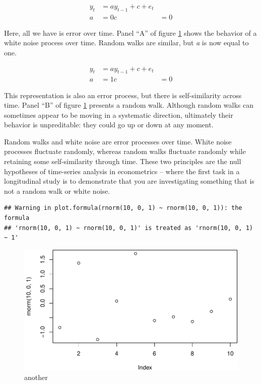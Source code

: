 \documentclass[]{article}
\begin{document}
\begin{equation}
\begin{split}
\label{whitenoise}
y_{t} &= a y_{t-1} + c + e_{t} \\ 
a &= 0
c &= 0
\end{split}
\end{equation}

\noindent Here, all we have is error over time. Panel ``A'' of figure
\ref{noise} shows the behavior of a white noise process over time.
Random walks are similar, but \emph{a} is now equal to one.

\begin{equation}
\begin{split}
\label{rw}
y_{t} &= a y_{t-1} + c + e_{t} \\ 
a &= 1
c &= 0
\end{split}
\end{equation}

\noindent This representation is also an error process, but there is
self-similarity across time. Panel ``B'' of figure \ref{noise} presents
a random walk. Although random walks can sometimes appear to be moving
in a systematic direction, ultimately their behavior is unpreditable:
they could go up or down at any moment.

Random walks and white noise are error processes over time. White noise
processes fluctuate randomly, whereas random walks fluctuate randomly
while retaining some self-similarity through time. These two principles
are the null hypotheses of time-series analysis in econometrics -- where
the first task in a longitudinal study is to demonstrate that you are
investigating something that is not a random walk or white noise.

\begin{verbatim}
## Warning in plot.formula(rnorm(10, 0, 1) ~ rnorm(10, 0, 1)): the formula
## 'rnorm(10, 0, 1) ~ rnorm(10, 0, 1)' is treated as 'rnorm(10, 0, 1) ~ 1'
\end{verbatim}

\begin{figure}
\centering
\includegraphics{princ_math_files/figure-latex/unnamed-chunk-2-1.pdf}
\caption{another\label{noise}}
\end{figure}
\end{document}
